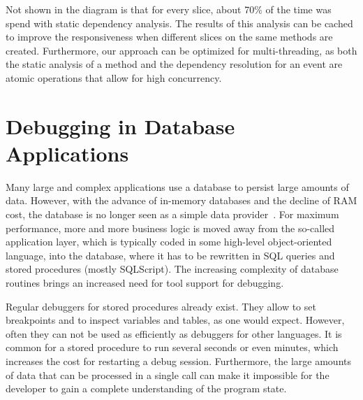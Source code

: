 \documentclass[english]{scrartcl}
\begin{document}
Not shown in the diagram is that for every slice, about 70\% of the time was spend with static dependency analysis.
The results of this analysis can be cached to improve the responsiveness when different slices on the same methods are created.
Furthermore, our approach can be optimized for multi-threading, as both the static analysis of a method and the dependency resolution for an event are atomic operations that allow for high concurrency.

\section{Debugging in Database Applications}
%
%
%
%

Many large and complex applications use a database to persist large amounts of data. 
However, with the advance of in-memory databases and the decline of RAM cost, the database is no longer seen as a simple data provider~\cite{plattner2011memory}.
For maximum performance, more and more business logic is moved away from the so-called application layer, which is typically coded in some high-level object-oriented language, into the database, where it has to be rewritten in SQL queries and stored procedures (mostly SQLScript).
The increasing complexity of database routines brings an increased need for tool support for debugging.

Regular debuggers for stored procedures already exist.
They allow to set breakpoints and to inspect variables and tables, as one would expect.
However, often they can not be used as efficiently as debuggers for other languages.
It is common for a stored procedure to run several seconds or even minutes, which increases the cost for restarting a debug session.
Furthermore, the large amounts of data that can be processed in a single call can make it impossible for the developer to gain a complete understanding of the program state.
\end{document}

